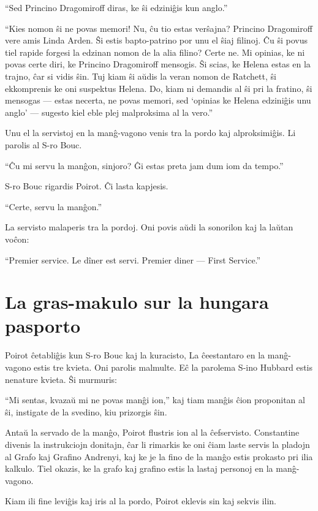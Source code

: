 ``Sed Princino Dragomiroff diras, ke ŝi edziniĝis kun anglo.''

``Kies nomon ŝi ne povas memori! Nu, ĉu tio estas verŝajna? Princino Dragomiroff vere amis Linda Arden. Ŝi estis bapto-patrino por unu el ŝiaj filinoj. Ĉu ŝi povus tiel rapide forgesi la edzinan nomon de la alia filino? Certe ne. Mi opinias, ke ni povas certe diri, ke Princino Dragomiroff mensogis. Ŝi scias, ke Helena estas en la trajno, ĉar si vidis ŝin. Tuj kiam ŝi aŭdis la veran nomon de Ratchett, ŝi ekkomprenis ke oni suspektus Helena. Do, kiam ni demandis al ŝi pri la fratino, ŝi mensogas --- estas necerta, ne povas memori, sed `opinias ke Helena edziniĝis unu anglo' --- sugesto kiel eble plej malproksima al la vero.''

Unu el la servistoj en la manĝ-vagono venis tra la pordo kaj alproksimiĝis. Li parolis al S-ro Bouc.

``Ĉu mi servu la manĝon, sinjoro? Ĝi estas preta jam dum iom da tempo.''

S-ro Bouc rigardis Poirot. Ĉi lasta kapjesis.

``Certe, servu la manĝon.''

La servisto malaperis tra la pordoj. Oni povis aŭdi la sonorilon kaj la laŭtan voĉon:

``Premier service. Le dîner est servi. Premier diner --- First Service.''

\chapter[La gras-makulo sur la hungara pasporto]{La gras-makulo sur la hungara pasporto}


Poirot ĉetabliĝis kun S-ro Bouc kaj la kuracisto, La ĉeestantaro en la manĝ-vagono estis tre kvieta. Oni parolis malmulte. Eĉ la parolema S-ino Hubbard estis nenature kvieta. Ŝi murmuris:

``Mi sentas, kvazaŭ mi ne povas manĝi ion,'' kaj tiam manĝis ĉion proponitan al ŝi, instigate de la svedino, kiu prizorgis ŝin.

Antaŭ la servado de la manĝo, Poirot flustris ion al la ĉefservisto. Constantine divenis la instrukciojn donitajn, ĉar li rimarkis ke oni ĉiam laste servis la pladojn al Grafo kaj Grafino Andrenyi, kaj ke je la fino de la manĝo estis prokasto pri ilia kalkulo. Tiel okazis, ke la grafo kaj grafino estis la lastaj personoj en la manĝ-vagono.

Kiam ili fine leviĝis kaj iris al la pordo, Poirot eklevis sin kaj sekvis ilin.

